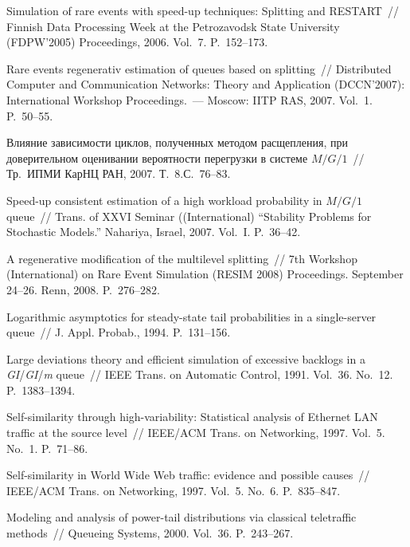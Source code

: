\begin{multicols}{2}
{{\begin{thebibliography}{99}
Simulation of rare events with speed-up techniques: Splitting and
RESTART~//  Finnish Data Processing Week at
   the Petrozavodsk State University (FDPW'2005) Proceedings, 2006. Vol.~7. P.~152--173.

 Rare events regenerativ estimation of queues based on splitting~//  
Distributed Computer and Communication Networks: Theory and Application
    (\mbox{DCCN'2007}): International
    Workshop Proceedings.~--- Moscow: IITP RAS, 2007. Vol.~1. P.~50--55.

 Влияние зависимости циклов, полученных методом расщепления,
    при доверительном оценивании вероятности перегрузки в системе $M/G/1$~// Тр.\
     ИПМИ КарНЦ РАН, 2007. Т.~8.\linebreak С.~76--83.

Speed-up consistent estimation of a high workload probability in
$M/G/1$
    queue~// Trans. of XXVI  Seminar ((International) ``Stability
     Problems for Stochastic Models.'' Nahariya, Israel, 2007. Vol.~I. P.~36--42.

A regenerative modification of the multilevel splitting~//
7th  Workshop (International) on Rare Event Simulation (RESIM 2008) Proceedings. September 24--26.
Renn, 2008. P.~276--282.

  Logarithmic asymptotics for steady-state
tail probabilities in a single-server queue~// J. Appl. Probab., 1994. P.~131--156.

 Large   deviations theory and
efficient simulation of excessive backlogs in a
\emph{GI}/\emph{GI}/\emph{m} queue~// IEEE Trans. on Automatic Control, 1991. Vol.~36. No.~12. P.~1383--1394.

Self-similarity through high-variability: Statistical analysis of
Ethernet LAN traffic at the source level~// IEEE/ACM Trans. on
Networking, 1997. Vol.~5. No.~1. P.~71--86.

Self-similarity in World Wide Web traffic: evidence and possible causes~// IEEE/ACM
Trans. on Networking, 1997. Vol.~5. No.~6. P.~835--847.

  Modeling and analysis
of power-tail distributions via classical teletraffic methods~//
Queueing Systems, 2000. Vol.~36. P.~243--267.


\end{thebibliography}}}
\end{multicols}
